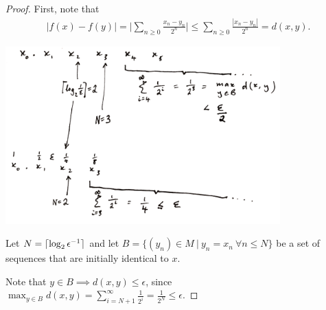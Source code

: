 \documentclass[12pt]{article}
\begin{document}
\begin{enumerate}[label=(\roman*)]
\begin{proof}
    First, note that
    \begin{align*}
      |f(x) - f(y)|
      =    \Big|\sum_{n \geq 0} \frac{x_n - y_n}{2^n}\Big|
      \leq \sum_{n \geq 0} \frac{|x_n - y_n|}{2^n}
      = d(x, y).
    \end{align*}

    \begin{mdframed}
      \includegraphics[width=300pt]{img/oxford-a2-2-5-diagram.png}
    \end{mdframed}


    Let $N = \lceil\log_2 \epsilon^{-1}\rceil$ and let
    $B = \{(y_n) \in M ~|~ y_n = x_n ~ \forall n \leq N\}$ be a set of sequences that are initially
    identical to $x$.

    Note that $y \in B \implies d(x, y) \leq \epsilon$, since
    $
      \max_{y \in B} d(x, y)
      = \sum_{i=N+1}^\infty \frac{1}{2^i}
      = \frac{1}{2^N}
      \leq \epsilon.
    $





  \end{proof}
\end{enumerate}
\end{document}
